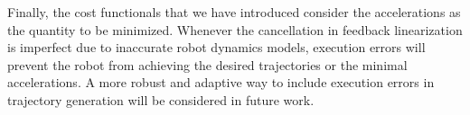 Finally, the cost functionals that we have introduced consider the accelerations as the quantity to be minimized. Whenever the cancellation in feedback linearization is imperfect due to inaccurate robot dynamics models, execution errors will prevent the robot from achieving the desired trajectories or the minimal accelerations. A more robust and adaptive way to include execution errors in trajectory generation will be considered in future work.

